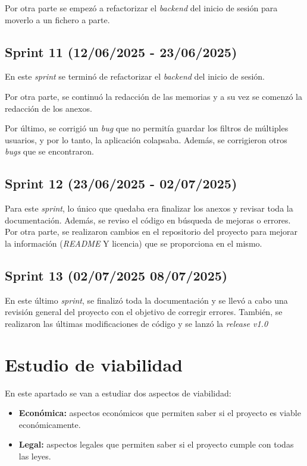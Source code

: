 Por otra parte se empezó a refactorizar el \textit{backend} del inicio de sesión para moverlo a un fichero a parte.

\subsection{Sprint 11 (12/06/2025 - 23/06/2025)}
En este \textit{sprint} se terminó de refactorizar el \textit{backend} del inicio de sesión.

Por otra parte, se continuó la redacción de las memorias y a su vez se comenzó la redacción de los anexos.

Por último, se corrigió un \textit{bug} que no permitía guardar los filtros de múltiples usuarios, y por lo tanto, la aplicación colapsaba. Además, se corrigieron otros \textit{bugs} que se encontraron.

\subsection{Sprint 12 (23/06/2025 - 02/07/2025)}
Para este \textit{sprint}, lo único que quedaba era finalizar los anexos y revisar toda la documentación. Además, se reviso el código en búsqueda de mejoras o errores. Por otra parte, se realizaron cambios en el repositorio del proyecto para mejorar la información (\textit{README} Y licencia) que se proporciona en el mismo.

\subsection{Sprint 13 (02/07/2025  08/07/2025)}
En este último \textit{sprint}, se finalizó toda la documentación y se llevó a cabo una revisión general del proyecto con el objetivo de corregir errores. También, se realizaron las últimas modificaciones de código y se lanzó la \textit{release v1.0}

\section{Estudio de viabilidad}
En este apartado se van a estudiar dos aspectos de viabilidad:
\begin{itemize}
    \item \textbf{Económica:} aspectos económicos que permiten saber si el proyecto es viable económicamente.
    \item \textbf{Legal:} aspectos legales que permiten saber si el proyecto cumple con todas las leyes.
\end{itemize}

